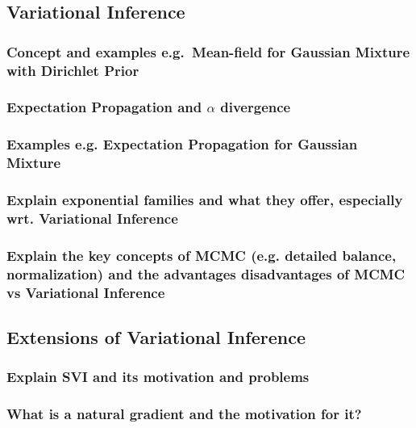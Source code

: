 \documentclass{article}
\begin{document}
\subsection{Variational Inference}


\subsubsection{Concept and examples e.g.~Mean-field for Gaussian Mixture with Dirichlet Prior}

\subsubsection{Expectation Propagation and $\alpha$ divergence}


\subsubsection{Examples e.g. Expectation Propagation for Gaussian Mixture}


\subsubsection{Explain exponential families and what they offer, especially wrt. Variational Inference}


\subsubsection{Explain the key concepts of MCMC (e.g. detailed balance, normalization) and the advantages disadvantages of MCMC vs Variational Inference}









\subsection{Extensions of Variational Inference}

\subsubsection{Explain SVI and its motivation and problems}

\subsubsection{What is a natural gradient and the motivation for it?}
\end{document}
